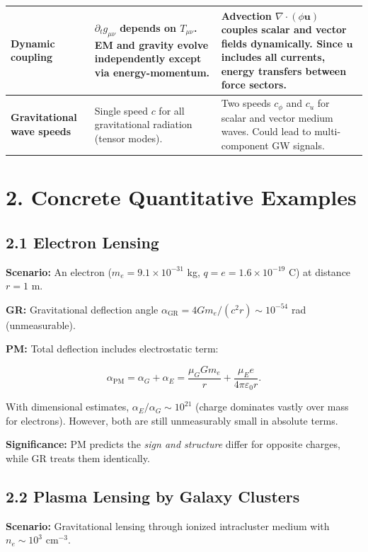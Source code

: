 \documentclass{article}
\begin{document}
\begin{center}
\begin{tabular}{p{4cm}|p{5cm}|p{5cm}}
\midrule
\textbf{Dynamic coupling} & 
$\partial_t g_{\mu\nu}$ depends on $T_{\mu\nu}$. EM and gravity evolve independently except via energy-momentum. &
Advection $\nabla\cdot(\phi\mathbf u)$ couples scalar and vector fields dynamically. Since $\mathbf u$ includes all currents, energy transfers between force sectors. \\
\midrule
\textbf{Gravitational wave speeds} & 
Single speed $c$ for all gravitational radiation (tensor modes). &
Two speeds $c_\phi$ and $c_u$ for scalar and vector medium waves. Could lead to multi-component GW signals. \\
\bottomrule
\end{tabular}
\end{center}

\section*{2. Concrete Quantitative Examples}

\subsection*{2.1 Electron Lensing}

\textbf{Scenario:} An electron ($m_e = 9.1 \times 10^{-31}$ kg, $q = e = 1.6
\times 10^{-19}$ C) at distance $r = 1$ m.

\textbf{GR:} Gravitational deflection angle $\alpha_{\text{GR}} = 4Gm_e/(c^2 r)
\sim 10^{-54}$ rad (unmeasurable).

\textbf{PM:} Total deflection includes electrostatic term:



\[
\alpha_{\text{PM}}
= \alpha_G + \alpha_E
= \frac{\mu_G G m_e}{r} + \frac{\mu_E e}{4\pi\varepsilon_0 r}.
\]



With dimensional estimates, $\alpha_E / \alpha_G \sim 10^{21}$ (charge dominates
vastly over mass for electrons). However, both are still unmeasurably small in
absolute terms.

\textbf{Significance:} PM predicts the \emph{sign and structure} differ for
opposite charges, while GR treats them identically.

\subsection*{2.2 Plasma Lensing by Galaxy Clusters}

\textbf{Scenario:} Gravitational lensing through ionized intracluster medium
with $n_e \sim 10^3$ cm$^{-3}$.
\end{document}
